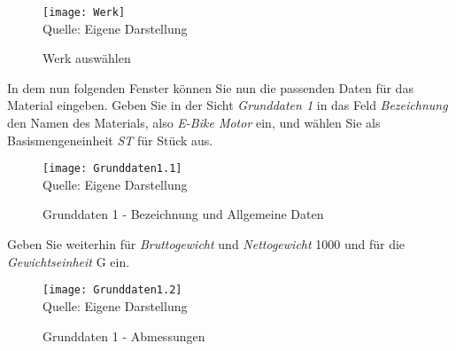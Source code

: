 \begin{figure}[H]
    \caption{Werk auswählen}\label{fig:werk}
    \texttt{[image: Werk]}
    \\
    Quelle: Eigene Darstellung
\end{figure}
In dem nun folgenden Fenster können Sie nun die passenden Daten für das Material eingeben. Geben Sie in der Sicht \textit{Grunddaten 1} in das Feld \textit{Bezeichnung}
 den Namen des Materials, also \textit{E-Bike Motor} ein, und wählen Sie als Basismengeneinheit \textit{ST} für Stück aus.
\begin{figure}[H]
    \caption{Grunddaten 1 - Bezeichnung und Allgemeine Daten}\label{fig:grunddaten1.1}
    \texttt{[image: Grunddaten1.1]}
    \\
    Quelle: Eigene Darstellung
\end{figure}
 
 Geben Sie weiterhin für \textit{Bruttogewicht} und \textit{Nettogewicht} 1000 und für die \textit{Gewichtseinheit} G ein.

\begin{figure}[H]
    \caption{Grunddaten 1 - Abmessungen}\label{fig:grunddaten1.2}
    \texttt{[image: Grunddaten1.2]}
    \\
    Quelle: Eigene Darstellung
\end{figure}
